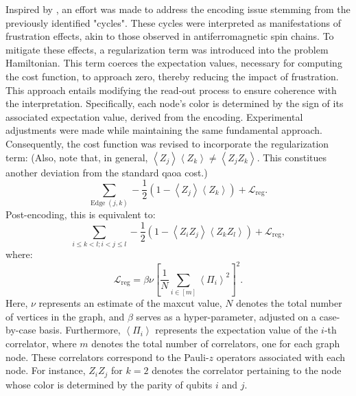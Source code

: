 Inspired by \cite{sciorilli2024largescale}, an effort was made to address the encoding issue stemming from the previously identified "cycles". These cycles were interpreted as manifestations of frustration effects, akin to those observed in antiferromagnetic spin chains. To mitigate these effects, a regularization term was introduced into the problem Hamiltonian. This term coerces the expectation values, necessary for computing the cost function, to approach zero, thereby reducing the impact of frustration. This approach entails modifying the read-out process to ensure coherence with the interpretation. Specifically, each node's color is determined by the sign of its associated expectation value, derived from the encoding. Experimental adjustments were made while maintaining the same fundamental approach. Consequently, the cost function was revised to incorporate the regularization term: (Also, note that, in general, $\left<Z_j\right>\left<Z_k\right> \neq \left<Z_jZ_k\right>$. This constitues another deviation from the standard \acrshort{qaoa} cost.)
\begin{equation}
\sum_{\text{Edge}\; (j,k)} -\frac{1}{2} \left(1-\left<Z_j\right>\left<Z_k\right>\right) + \mathcal{L}_{\text{reg}}.
\end{equation}
Post-encoding, this is equivalent to:
\begin{equation}
\sum_{i \leq k<l;i<j \leq l} -\frac{1}{2}(1-\left<Z_iZ_j\right>\left<Z_kZ_l\right>) + \mathcal{L}_{\text{reg}},
\end{equation}
where:
\begin{equation}
\mathcal{L}_{\text{reg}} = \beta \nu \left[\frac{1}{N}\sum_{i\in[m]}\left<\Pi_i\right>^2\right]^2.
\end{equation}
Here, $\nu$ represents an estimate of the \acrshort{maxcut} value, $N$ denotes the total number of vertices in the graph, and $\beta$ serves as a hyper-parameter, adjusted on a case-by-case basis. Furthermore, \(\left<\Pi_i\right>\) represents the expectation value of the \(i\)-th correlator, where \(m\) denotes the total number of correlators, one for each graph node. These correlators correspond to the Pauli-\(z\) operators associated with each node. For instance, \(Z_i Z_j\) for \(k=2\) denotes the correlator pertaining to the node whose color is determined by the parity of qubits \(i\) and \(j\).

